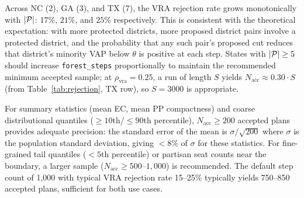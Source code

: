 Across NC (2), GA (3), and TX (7), the VRA rejection rate grows monotonically
with $|\mathcal{P}|$: $17\%$, $21\%$, and $25\%$ respectively.
This is consistent with the theoretical expectation: with more protected
districts, more proposed district pairs involve a protected district, and
the probability that any such pair's proposed cut reduces that district's
minority VAP below $\theta$ is positive at each step.
States with $|\mathcal{P}| \geq 5$ should increase \texttt{forest\_steps}
proportionally to maintain the recommended minimum accepted sample; at
$\rho_{\mathrm{vra}} = 0.25$, a run of length $S$ yields
$N_{\mathrm{acc}} \approx 0.30 \cdot S$ (from Table~\ref{tab:rejection},
TX row), so $S = 3000$ is appropriate.

For summary statistics (mean EC, mean PP compactness) and coarse
distributional quantiles ($\geq 10$th/$\leq 90$th percentile),
$N_{\mathrm{acc}} \geq 200$ accepted plans provides adequate precision:
the standard error of the mean is $\sigma / \sqrt{200}$ where $\sigma$
is the population standard deviation, giving $< 8\%$ of $\sigma$ for
these statistics. For fine-grained tail quantiles ($< 5$th percentile) or
partisan seat counts near the boundary, a larger sample
($N_{\mathrm{acc}} \geq 500$--$1{,}000$) is recommended. The default step
count of 1,000 with typical VRA rejection rate 15--25\% typically yields
750--850 accepted plans, sufficient for both use cases.
